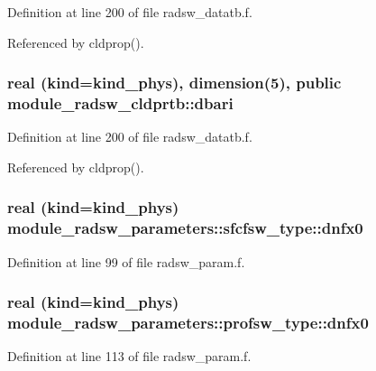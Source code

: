 Definition at line 200 of file radsw\+\_\+datatb.\+f.



Referenced by cldprop().

\subsubsection[{\texorpdfstring{dbari}{dbari}}]{\setlength{\rightskip}{0pt plus 5cm}real (kind=kind\+\_\+phys), dimension(5), public module\+\_\+radsw\+\_\+cldprtb\+::dbari}\hypertarget{group__module__radsw__main_gaf8b02590603ea2f838d954cb0a93bbeb}{}\label{group__module__radsw__main_gaf8b02590603ea2f838d954cb0a93bbeb}


Definition at line 200 of file radsw\+\_\+datatb.\+f.



Referenced by cldprop().

\subsubsection[{\texorpdfstring{dnfx0}{dnfx0}}]{\setlength{\rightskip}{0pt plus 5cm}real (kind=kind\+\_\+phys) module\+\_\+radsw\+\_\+parameters\+::sfcfsw\+\_\+type\+::dnfx0}\hypertarget{group__module__radsw__main_ga2b1a4d8e0e93332fd08f3aa6b68fb141}{}\label{group__module__radsw__main_ga2b1a4d8e0e93332fd08f3aa6b68fb141}


Definition at line 99 of file radsw\+\_\+param.\+f.

\subsubsection[{\texorpdfstring{dnfx0}{dnfx0}}]{\setlength{\rightskip}{0pt plus 5cm}real (kind=kind\+\_\+phys) module\+\_\+radsw\+\_\+parameters\+::profsw\+\_\+type\+::dnfx0}\hypertarget{group__module__radsw__main_gaff3ff3155ed05a18fa7caba351d1c503}{}\label{group__module__radsw__main_gaff3ff3155ed05a18fa7caba351d1c503}


Definition at line 113 of file radsw\+\_\+param.\+f.

